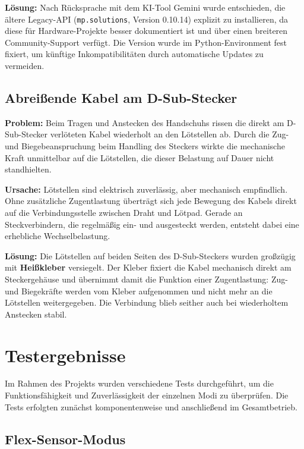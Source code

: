 \documentclass[12pt,a4paper]{article}
\begin{document}
\textbf{Lösung:} Nach Rücksprache mit dem KI-Tool Gemini wurde entschieden, die ältere Legacy-API (\texttt{mp.solutions}, Version 0.10.14) explizit zu installieren, da diese für Hardware-Projekte besser dokumentiert ist und über einen breiteren Community-Support verfügt. Die Version wurde im Python-Environment fest fixiert, um künftige Inkompatibilitäten durch automatische Updates zu vermeiden.

\subsection{Abreißende Kabel am D-Sub-Stecker}
\label{sec:kabel}

\textbf{Problem:} Beim Tragen und Anstecken des Handschuhs rissen die direkt am D-Sub-Stecker verlöteten Kabel wiederholt an den Lötstellen ab. Durch die Zug- und Biegebeanspruchung beim Handling des Steckers wirkte die mechanische Kraft unmittelbar auf die Lötstellen, die dieser Belastung auf Dauer nicht standhielten.

\textbf{Ursache:} Lötstellen sind elektrisch zuverlässig, aber mechanisch empfindlich. Ohne zusätzliche Zugentlastung überträgt sich jede Bewegung des Kabels direkt auf die Verbindungsstelle zwischen Draht und Lötpad. Gerade an Steckverbindern, die regelmäßig ein- und ausgesteckt werden, entsteht dabei eine erhebliche Wechselbelastung.

\textbf{Lösung:} Die Lötstellen auf beiden Seiten des D-Sub-Steckers wurden großzügig mit \textbf{Heißkleber} versiegelt. Der Kleber fixiert die Kabel mechanisch direkt am Steckergehäuse und übernimmt damit die Funktion einer Zugentlastung: Zug- und Biegekräfte werden vom Kleber aufgenommen und nicht mehr an die Lötstellen weitergegeben. Die Verbindung blieb seither auch bei wiederholtem Anstecken stabil.

\newpage

\section{Testergebnisse}

Im Rahmen des Projekts wurden verschiedene Tests durchgeführt, um die Funktionsfähigkeit und Zuverlässigkeit der einzelnen Modi zu überprüfen. Die Tests erfolgten zunächst komponentenweise und anschließend im Gesamtbetrieb.

\subsection{Flex-Sensor-Modus}
\end{document}
